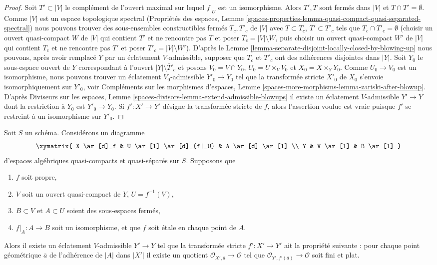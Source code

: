 \begin{proof}
Soit $T' \subset |V|$ le complément de l'ouvert maximal sur lequel
$f|_U$ est un isomorphisme. Alors $T', T$ sont fermés dans $|V|$ et
$T \cap T' = \emptyset$. Comme $|V|$ est un espace topologique spectral
(Propriétés des espaces, Lemme
\ref{spaces-properties-lemma-quasi-compact-quasi-separated-spectral})
nous pouvons trouver des sous-ensembles constructibles fermés $T_c, T'_c$ de $|V|$
avec $T \subset T_c$, $T' \subset T'_c$ tels que
$T_c \cap T'_c = \emptyset$ (choisir un ouvert quasi-compact
$W$ de $|V|$ qui contient $T'$ et ne rencontre pas $T$
et poser $T_c = |V| \setminus W$, puis choisir un ouvert quasi-compact
$W'$ de $|V|$ qui contient $T_c$ et ne rencontre pas $T'$
et poser $T'_c = |V| \setminus W'$).
D'après le Lemme \ref{lemma-separate-disjoint-locally-closed-by-blowing-up}
nous pouvons, après avoir remplacé $Y$ par un éclatement $V$-admissible, supposer que $T_c$ et $T'_c$ ont des adhérences disjointes dans $|Y|$.  
Soit $Y_0$ le sous-espace ouvert de $Y$ correspondant à l'ouvert $|Y| \setminus \overline{T}'_c$ et posons $V_0 = V \cap Y_0$, $U_0 = U \times_V V_0$ et $X_0 = X \times_Y Y_0$.  
Comme $U_0 \to V_0$ est un isomorphisme, nous pouvons trouver un éclatement $V_0$-admissible $Y'_0 \to Y_0$ tel que la transformée stricte $X'_0$ de $X_0$ s'envoie isomorphiquement sur $Y'_0$, voir Compléments sur les morphismes d'espaces, Lemme \ref{spaces-more-morphisms-lemma-zariski-after-blowup}.  
D'après Diviseurs sur les espaces, Lemme \ref{spaces-divisors-lemma-extend-admissible-blowups} il existe un éclatement $V$-admissible $Y' \to Y$ dont la restriction à $Y_0$ est $Y'_0 \to Y_0$. Si $f' : X' \to Y'$ désigne la transformée stricte de $f$, alors l'assertion voulue est vraie puisque $f'$ se restreint à un isomorphisme sur $Y'_0$.  
\end{proof}

\begin{lemma}
\label{lemma-blowup-etale-along}
Soit $S$ un schéma. Considérons un diagramme
$$
\xymatrix{
X \ar[d]_f & U \ar[l] \ar[d]_{f|_U} & A \ar[d] \ar[l] \\
Y & V \ar[l] & B \ar[l]
}
$$
d'espaces algébriques quasi-compacts et quasi-séparés sur $S$.
Supposons que
\begin{enumerate}
\item $f$ soit propre,
\item $V$ soit un ouvert quasi-compact de $Y$, $U = f^{-1}(V)$,
\item $B \subset V$ et $A \subset U$ soient des sous-espaces fermés,
\item $f|_A : A \to B$ soit un isomorphisme, et que
$f$ soit \'etale en chaque point de $A$.
\end{enumerate}
Alors il existe un éclatement $V$-admissible $Y' \to Y$ tel que la transformée stricte
$f' : X' \to Y'$ ait la propriété suivante : pour chaque point géométrique
$\overline{a}$ de l'adhérence de $|A|$ dans $|X'|$
il existe un quotient $\mathcal{O}_{X', \overline{a}} \to \mathcal{O}$
tel que $\mathcal{O}_{Y', f'(\overline{a})} \to \mathcal{O}$
soit fini et plat.
\end{lemma}

